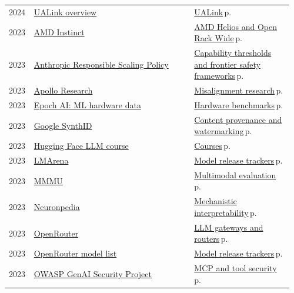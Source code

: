 \documentclass[10pt,a4paper,openany]{report}
\begin{document}
{\begin{longtable}{@{}p{0.07\linewidth}>{\raggedright}p{0.55\linewidth}>{\raggedright\arraybackslash}p{0.34\linewidth}@{}}
2024 & \href{https://en.wikipedia.org/wiki/UALink}{UALink overview} & \hyperref[c:hardware-3]{UALink}\,{\color{muted}\scriptsize p.\,\pageref{c:hardware-3}}\\
2023 & \href{https://www.amd.com/en/products/accelerators/instinct.html}{AMD Instinct} & \hyperref[c:hardware-1]{AMD Helios and Open Rack Wide}\,{\color{muted}\scriptsize p.\,\pageref{c:hardware-1}}\\
2023 & \href{https://www.anthropic.com/responsible-scaling-policy}{Anthropic Responsible Scaling Policy} & \hyperref[c:safety-0]{Capability thresholds and frontier safety frameworks}\,{\color{muted}\scriptsize p.\,\pageref{c:safety-0}}\\
2023 & \href{https://www.apolloresearch.ai}{Apollo Research} & \hyperref[c:safety-9]{Misalignment research}\,{\color{muted}\scriptsize p.\,\pageref{c:safety-9}}\\
2023 & \href{https://epoch.ai/data/machine-learning-hardware}{Epoch AI: ML hardware data} & \hyperref[c:hardware-16]{Hardware benchmarks}\,{\color{muted}\scriptsize p.\,\pageref{c:hardware-16}}\\
2023 & \href{https://deepmind.google/models/synthid/}{Google SynthID} & \hyperref[c:safety-14]{Content provenance and watermarking}\,{\color{muted}\scriptsize p.\,\pageref{c:safety-14}}\\
2023 & \href{https://huggingface.co/learn/llm-course}{Hugging Face LLM course} & \hyperref[c:learn-1]{Courses}\,{\color{muted}\scriptsize p.\,\pageref{c:learn-1}}\\
2023 & \href{https://lmarena.ai}{LMArena} & \hyperref[c:landscape-4]{Model release trackers}\,{\color{muted}\scriptsize p.\,\pageref{c:landscape-4}}\\
2023 & \href{https://mmmu-benchmark.github.io}{MMMU} & \hyperref[c:vlm-9]{Multimodal evaluation}\,{\color{muted}\scriptsize p.\,\pageref{c:vlm-9}}\\
2023 & \href{https://www.neuronpedia.org}{Neuronpedia} & \hyperref[c:safety-6]{Mechanistic interpretability}\,{\color{muted}\scriptsize p.\,\pageref{c:safety-6}}\\
2023 & \href{https://openrouter.ai}{OpenRouter} & \hyperref[c:inference-7]{LLM gateways and routers}\,{\color{muted}\scriptsize p.\,\pageref{c:inference-7}}\\
2023 & \href{https://openrouter.ai/models}{OpenRouter model list} & \hyperref[c:landscape-4]{Model release trackers}\,{\color{muted}\scriptsize p.\,\pageref{c:landscape-4}}\\
2023 & \href{https://genai.owasp.org/llm-top-10/}{OWASP GenAI Security Project} & \hyperref[c:safety-4]{MCP and tool security}\,{\color{muted}\scriptsize p.\,\pageref{c:safety-4}}\\

\end{longtable}}
\end{document}

